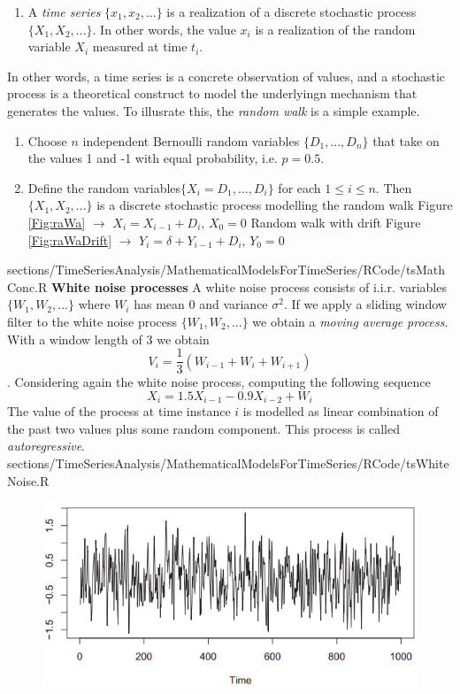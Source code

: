 {{\begin{enumerate}
	\item A \textit{time series} $\{x_1, x_2, . . .\}$ is a realization of a discrete stochastic process $\{X_1, X_2, . . . \}$. In other words, the value $x_i$ is a realization of the random variable $X_i$ measured at time $t_i$.
\end{enumerate}
In other words, a time series is a concrete observation of values, and a stochastic process is a theoretical construct to model the underlyingn mechanism that generates the values. To illusrate this, the \textit{random walk} is a simple example.
\begin{enumerate}
	\item  Choose $n$ independent Bernoulli random variables $\{D_1, . . .,D_n \}$ that take on the values 1 and -1 with equal probability, i.e. $p = 0.5$.
	\item  Define the random variables$\{X_i=D_1, . . .,D_i \}$  for each $1 \leq i \leq n$. Then $\{X_1, X_2, . . . \}$ is a discrete stochastic process modelling the random walk \vfill
	 Figure \ref{Fig:raWa} $\rightarrow$ $X_i=X_{i-1}+D_i, \, X_0 = 0$\vfill
	 Random walk with drift \vfill
	 Figure \ref{Fig:raWaDrift}	  $\rightarrow$ $Y_i=\delta + Y_{i-1}+D_i, \, Y_0 = 0$
\end{enumerate}
}
{sections/TimeSeriesAnalysis/MathematicalModelsForTimeSeries/RCode/tsMathConc.R}
\RTheory
{\textbf{White noise processes}\vfill
A white noise process consists of i.i.r. variables $\{W_1,W_2,...\}$ where $W_i$ has mean $0$ and variance $\sigma^2$.
\vfill
\hfill
\break
If we apply a sliding window filter to the white noise process $\{W_1, W_2,...\}$ we obtain a \textit{moving average process}. With a window length of 3 we obtain
$$V_i =\frac{1}{3}(W_{i-1}+W_{i}+W_{i+1})$$.
\vfill
\hfill
\break
Considering again the white noise process, computing the following sequence
$$X_i = 1.5X_{i-1}-0.9X_{i-2}+W_i $$
The value of the process at time instance $i$ is modelled as linear combination of the past two values plus some random component. This process is called \textit{autoregressive}.
}
{sections/TimeSeriesAnalysis/MathematicalModelsForTimeSeries/RCode/tsWhiteNoise.R}
\begin{figure}[H]\centering
	\begin{minipage}[c]{0.5\textwidth}
		\includegraphics[width=1\linewidth]{images/whNoMovAv.png}

\end{minipage}
\end{figure}}
